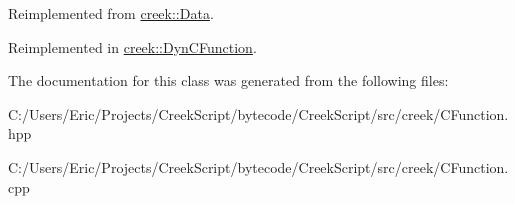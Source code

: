 Reimplemented from \hyperlink{classcreek_1_1_data_a32fa079c6f972eae802a5ac5b83d8a07}{creek\+::\+Data}.



Reimplemented in \hyperlink{classcreek_1_1_dyn_c_function_a19c3af888a7cdaadd01094fe0e0a52f0}{creek\+::\+Dyn\+C\+Function}.



The documentation for this class was generated from the following files\+:\begin{DoxyCompactItemize}
\item 
C\+:/\+Users/\+Eric/\+Projects/\+Creek\+Script/bytecode/\+Creek\+Script/src/creek/C\+Function.\+hpp\item 
C\+:/\+Users/\+Eric/\+Projects/\+Creek\+Script/bytecode/\+Creek\+Script/src/creek/C\+Function.\+cpp\end{DoxyCompactItemize}
